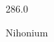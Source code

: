 \documentclass[12pt]{article}
\begin{document}
\hfill{}
\vfill
\begin{center}
  {\fontsize{50}{60}
  }

  \vspace{1em}

  286.0

Nihonium
\end{center}
\vfill
\end{document}
